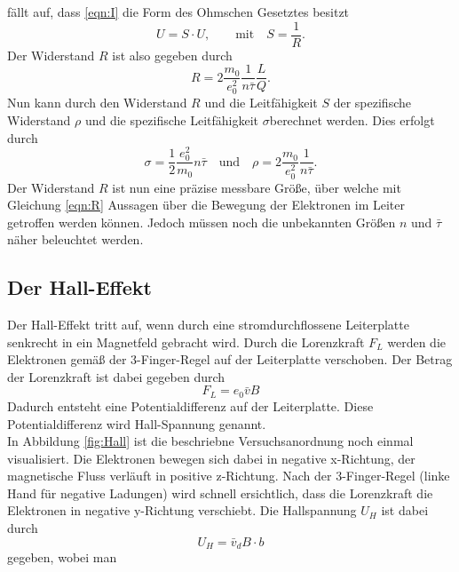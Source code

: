 fällt auf, dass \eqref{eqn:I} die Form des Ohmschen Gesetztes besitzt
\begin{equation}
    U=S\cdot U, \qquad \text{mit}\quad S=\frac{1}{R}.
\end{equation}
Der Widerstand $R$ ist also gegeben durch
\begin{equation}
    R=2\frac{m_0}{e_0^2}\frac{1}{n\bar{\tau}}\frac{L}{Q}. \label{eqn:R}
\end{equation}
Nun kann durch den Widerstand $R$ und die Leitfähigkeit $S$ der spezifische Widerstand $\rho$ und
die spezifische Leitfähigkeit $\sigma$berechnet werden. Dies erfolgt durch
\begin{equation}
    \sigma=\frac{1}{2}\frac{e_0^2}{m_0}n\bar{\tau} 
    \quad \text{und} \quad
    \rho=2\frac{m_0}{e_0^2}\frac{1}{n\bar{\tau}}.
\end{equation}
Der Widerstand $R$ ist nun eine präzise messbare Größe, über welche mit Gleichung \ref{eqn:R} Aussagen
über die Bewegung der Elektronen im Leiter getroffen werden können. Jedoch müssen noch die unbekannten
Größen $n$ und $\bar{\tau}$ näher beleuchtet werden.
\subsection{Der Hall-Effekt}
Der Hall-Effekt tritt auf, wenn durch eine stromdurchflossene Leiterplatte senkrecht in ein Magnetfeld 
gebracht wird. Durch die Lorenzkraft $F_L$ werden die Elektronen gemäß der 3-Finger-Regel auf der Leiterplatte
verschoben. Der Betrag der Lorenzkraft ist dabei gegeben durch
\begin{equation}
    F_L=e_0\bar{v}B
\end{equation} 
Dadurch entsteht eine Potentialdifferenz auf der Leiterplatte. Diese Potentialdifferenz wird 
Hall-Spannung genannt. \\
In Abbildung \ref{fig:Hall} ist die beschriebne Versuchsanordnung noch einmal visualisiert.
Die Elektronen bewegen sich dabei in negative x-Richtung, der magnetische Fluss verläuft in positive z-Richtung.
Nach der 3-Finger-Regel (linke Hand für negative Ladungen) wird schnell ersichtlich, dass die Lorenzkraft die 
Elektronen in negative y-Richtung verschiebt.
%
%
Die Hallspannung $U_H$ ist dabei durch
\begin{equation}
    U_H=\bar{v}_dB\cdot b
\end{equation}
gegeben, wobei man 